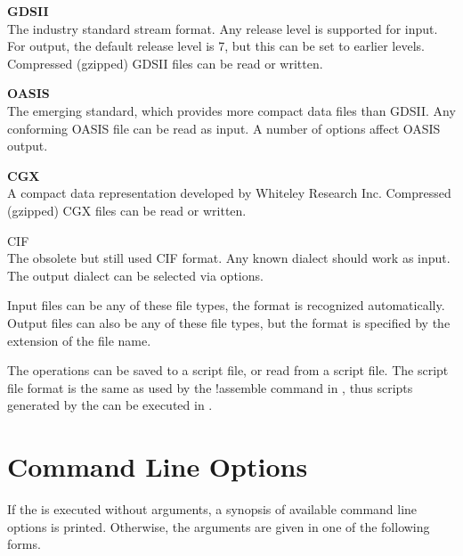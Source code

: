 \begin{description}
\item{\bf GDSII}\\
The industry standard stream format.  Any release level is supported
for input.  For output, the default release level is 7, but this can
be set to earlier levels.  Compressed (gzipped) GDSII files can be
read or written.

\item{\bf OASIS}\\
The emerging standard, which provides more compact data files than
GDSII.  Any conforming OASIS file can be read as input.  A number of
options affect OASIS output.

\item{\bf CGX}\\
A compact data representation developed by Whiteley Research Inc. 
Compressed (gzipped) CGX files can be read or written.

\item{CIF}\\
The obsolete but still used CIF format.  Any known dialect should
work as input.  The output dialect can be selected via options.
\end{description}

Input files can be any of these file types, the format is recognized
automatically.  Output files can also be any of these file types, but
the format is specified by the extension of the file name.

The operations can be saved to a script file, or read from a script
file.  The script file format is the same as used by the {\cb
!assemble} command in {\Xic}, thus scripts generated by the
{\FileTool} can be executed in {\Xic}.

\section{Command Line Options}

If the {\FileTool} is executed without arguments, a synopsis of
available command line options is printed.  Otherwise, the arguments
are given in one of the following forms.

